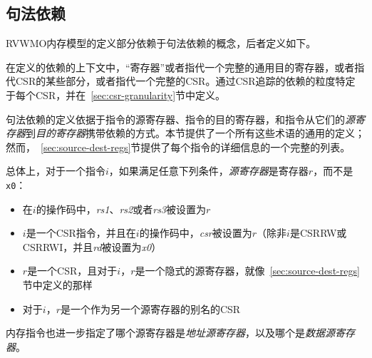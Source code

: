 \subsection*{句法依赖}
\label{sec:memorymodel:dependencies}
RVWMO内存模型的定义部分依赖于句法依赖的概念，后者定义如下。

在定义的依赖的上下文中，“寄存器”或者指代一个完整的通用目的寄存器，或者指代CSR的某些部分，或者指代一个完整的CSR。通过CSR追踪的依赖的粒度特定于每个CSR，并在~\ref{sec:csr-granularity}节中定义。

句法依赖的定义依据于指令的源寄存器、指令的目的寄存器，和指令从它们的{\em 源寄存器}到{\em 目的寄存器}携带依赖的方式。本节提供了一个所有这些术语的通用的定义；然而，~\ref{sec:source-dest-regs}节提供了每个指令的详细信息的一个完整的列表。

总体上，对于一个指令$i$，如果满足任意下列条件，{\em 源寄存器}是寄存器$r$，而不是{\tt x0}：
\begin{itemize}
  \item 在$i$的操作码中，{\em rs1}、{\em rs2}或者{\em rs3}被设置为$r$  %
  \item $i$是一个CSR指令，并且在$i$的操作码中，{\em csr}被设置为$r$（除非$i$是CSRRW或CSRRWI，并且{\em rd}被设置为{\em x0}）  %
  \item $r$是一个CSR，且对于$i$，$r$是一个隐式的源寄存器，就像~\ref{sec:source-dest-regs}节中定义的那样  %
  \item 对于$i$，$r$是一个作为另一个源寄存器的别名的CSR %
\end{itemize}
内存指令也进一步指定了哪个源寄存器是{\em 地址源寄存器}，以及哪个是{\em 数据源寄存器}。

